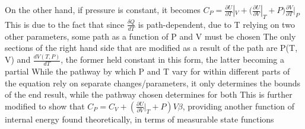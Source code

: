 \begin{outline*}
\2 On the other hand, if pressure is constant, it becomes $C_P = \frac{\partial U}{\partial T}|_V + (\frac{\partial U}{\partial V}|_T + P)\frac{\partial V}{\partial T}|_P$
\3 This is due to the fact that since $\frac{\delta Q}{dT}$ is path-dependent, due to T relying on two other parameters, some path as a function of P and V must be chosen
\4 The only sections of the right hand side that are modified as a result of the path are P(T, V) and $\frac{dV(T, P)}{dT}$, the former held constant in this form, the latter becoming a partial
\4 While the pathway by which P and T vary for within different parts of the equation rely on separate changes/parameters, it only determines the bounds of the end result, while the pathway chosen determines for both
\3 This is further modified to show that $C_P = C_V + (\frac{\partial U}{\partial V}|_T + P)V\beta$, providing another function of internal energy found theoretically, in terms of measurable state functions
\end{outline*}
